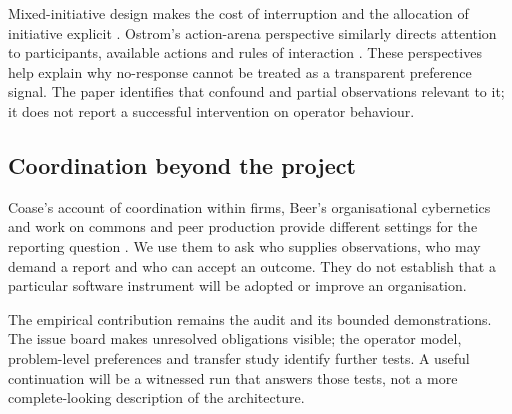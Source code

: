 Mixed-initiative design makes the cost of interruption and the allocation of
initiative explicit \cite{horvitz1999mixed}. Ostrom's action-arena perspective
similarly directs attention to participants, available actions and rules of
interaction \cite{ostrom2005understanding}. These perspectives help explain
why no-response cannot be treated as a transparent preference signal.
The paper identifies that confound and partial observations relevant to it;
it does not report a successful intervention on operator behaviour.

\subsection*{Coordination beyond the project}

Coase's account of coordination within firms, Beer's organisational cybernetics
and work on commons and peer production provide different settings for the
reporting question \cite{coase1937nature,beer1972brain,ostrom1990governing,
benkler2006wealth}. We use them to ask who supplies observations, who may demand
a report and who can accept an outcome. They do not establish that a particular
software instrument will be adopted or improve an organisation.

The empirical contribution remains the audit and its bounded demonstrations.
The issue board makes unresolved obligations visible; the operator model,
problem-level preferences and transfer study identify further tests. A useful
continuation will be a witnessed run that answers those tests, not a more
complete-looking description of the architecture.
